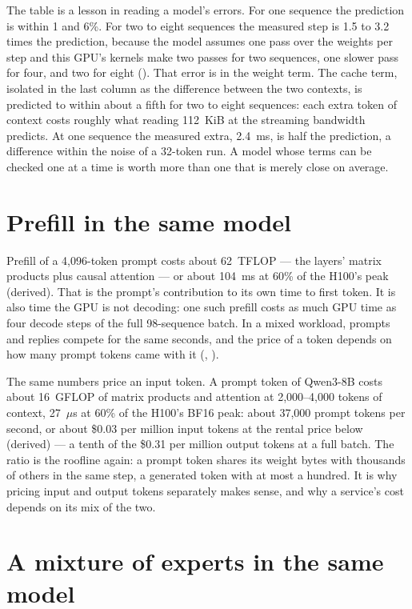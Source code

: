 \noindent The table is a lesson in reading a model's errors. For one sequence
the prediction is within 1 and 6\%. For two to eight sequences the measured step
is 1.5 to 3.2 times the prediction, because the model assumes one pass over the
weights per step and this GPU's kernels make two passes for two sequences, one
slower pass for four, and two for eight (). That error is in the
weight term. The cache term, isolated in the last column as the difference
between the two contexts, is predicted to within about a fifth for two to eight
sequences: each extra token of context costs roughly what reading 112~KiB at the
streaming bandwidth predicts. At one sequence the measured extra, 2.4~ms, is half
the prediction, a difference within the noise of a 32-token run. A model whose
terms can be checked one at a time is worth more than one that is merely close on
average.

\section{Prefill in the same model}

Prefill of a 4,096-token prompt costs about 62~TFLOP --- the layers' matrix
products plus causal attention --- or about 104~ms at 60\% of the H100's peak
(derived). That is the prompt's contribution to its own time to first token.
It is also time the GPU is not decoding: one such prefill costs as much GPU
time as four decode steps of the full 98-sequence batch. In a mixed workload,
prompts and replies compete for the same seconds, and the price of a token
depends on how many prompt tokens came with it (,
).

The same numbers price an input token. A prompt token of Qwen3-8B costs about
16~GFLOP of matrix products and attention at 2,000--4,000 tokens of context, 27~$\mu$s
at 60\% of the H100's BF16 peak: about 37,000 prompt tokens per second, or about
\$0.03 per million input tokens at the rental price below (derived) --- a tenth
of the \$0.31 per million output tokens at a full batch. The ratio is the
roofline again: a prompt token shares its weight bytes with thousands of others
in the same step, a generated token with at most a hundred. It is why pricing
input and output tokens separately makes sense, and why a service's cost depends
on its mix of the two.

\section{A mixture of experts in the same model}

